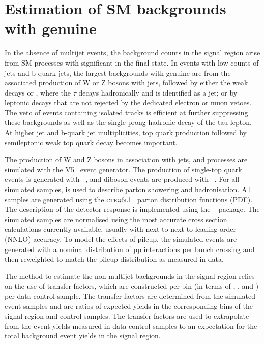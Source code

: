 \section{Estimation of SM backgrounds with genuine \ptvecmiss}
\label{sec:ewk_background}

In the absence of multijet events, the background counts in the signal
region arise from SM processes with significant \ETmiss in the final
state. In events with low counts of jets and b-quark jets, the largest
backgrounds with genuine \ptvecmiss are from the associated production of
W or Z bosons with jets, followed by either the weak decays \znunu or
\wtaunu, where the $\tau$ decays hadronically and is identified as a
jet; or by leptonic decays that are not rejected by the dedicated
electron or muon vetoes. The veto of events containing isolated tracks
is efficient at further suppressing these backgrounds as well as the
single-prong hadronic decay of the tau lepton. At higher jet and
b-quark jet multiplicities, top quark production followed by
semileptonic weak top quark decay becomes important.

The production of W and Z bosons in association with jets, \ttbar and
\gj processes are simulated with the \MADGRAPH V5~\cite{madgraph}
event generator. The production of single-top quark events is
generated with \POWHEG~\cite{powheg}, and diboson events are produced
with ~\cite{pythia8}. For all simulated samples, 
is used to describe parton showering and hadronisation. All samples
are generated using the \textsc{cteq6l1}~\cite{Pumplin:2002vw} parton
distribution functions (PDF). The description of the detector response
is implemented using the \GEANTfour~\cite{geant} package. The
simulated samples are normalised using the most accurate cross section
calculations currently available, usually with
next-to-next-to-leading-order (NNLO) accuracy. To model the effects of
pileup, the simulated events are generated with a nominal distribution
of pp interactions per bunch crossing and then reweighted to match the
pileup distribution as measured in data.

The method to estimate the non-multijet backgrounds in the signal
region relies on the use of transfer factors, which are constructed
per bin (in terms of \njet, \nb, and \scalht) per data control
sample. The transfer factors are determined from the simulated event
samples and are ratios of expected yields in the corresponding bins of
the signal region and control samples. The transfer factors are used
to extrapolate from the event yields measured in data control samples
to an expectation for the total background event yields in the signal
region.

